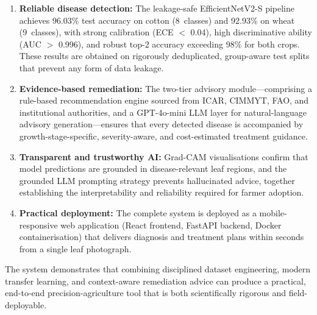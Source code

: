 \documentclass[12pt,a4paper]{report}
\begin{document}
\begin{enumerate}
    \item \textbf{Reliable disease detection:} The leakage-safe EfficientNetV2-S pipeline achieves 96.03\% test accuracy on cotton (8~classes) and 92.93\% on wheat (9~classes), with strong calibration (ECE $<$ 0.04), high discriminative ability (AUC $>$ 0.996), and robust top-2 accuracy exceeding 98\% for both crops. These results are obtained on rigorously deduplicated, group-aware test splits that prevent any form of data leakage.

    \item \textbf{Evidence-based remediation:} The two-tier advisory module---comprising a rule-based recommendation engine sourced from ICAR, CIMMYT, FAO, and institutional authorities, and a GPT-4o-mini LLM layer for natural-language advisory generation---ensures that every detected disease is accompanied by growth-stage-specific, severity-aware, and cost-estimated treatment guidance.

    \item \textbf{Transparent and trustworthy AI:} Grad-CAM visualisations confirm that model predictions are grounded in disease-relevant leaf regions, and the grounded LLM prompting strategy prevents hallucinated advice, together establishing the interpretability and reliability required for farmer adoption.

    \item \textbf{Practical deployment:} The complete system is deployed as a mobile-responsive web application (React frontend, FastAPI backend, Docker containerisation) that delivers diagnosis and treatment plans within seconds from a single leaf photograph.
\end{enumerate}

The system demonstrates that combining disciplined dataset engineering, modern transfer learning, and context-aware remediation advice can produce a practical, end-to-end precision-agriculture tool that is both scientifically rigorous and field-deployable.
\end{document}

